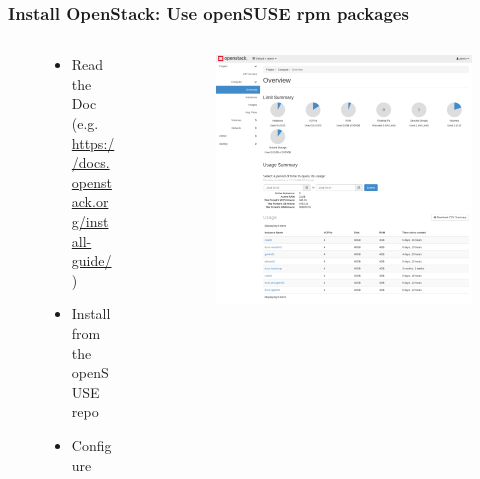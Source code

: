 \documentclass[aspectratio=169,11pt,hyperref={colorlinks=true}]{beamer}
\begin{document}
\begin{frame}
  \frametitle{Install OpenStack: Use openSUSE rpm packages}
  \begin{columns}[T]
    \begin{column}{0.55\textwidth}
      \begin{figure}
        \begin{itemize}
        \item Read the Doc (e.g. \url{https://docs.openstack.org/install-guide/})
        \item Install from the openSUSE repo
        \item Configure
        \end{itemize}
      \end{figure}
    \end{column}
    \begin{column}{0.5\textwidth}
      \begin{figure}
        \includegraphics[width=1.0\textwidth]{openstack-dashboard-instances.png}
      \end{figure}
    \end{column}
  \end{columns}
\end{frame}
\end{document}
